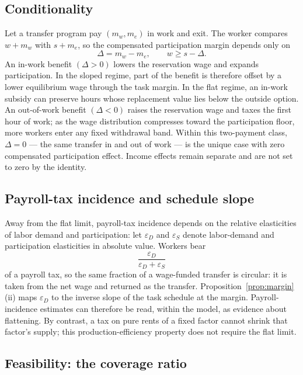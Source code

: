 \documentclass[12pt]{article}
\theoremstyle{plain}
\begin{document}
\subsection{Conditionality}\label{app:conditionality}

Let a transfer program pay $(m_w,m_e)$ in work and exit. The worker compares $w+m_w$ with $s+m_e$, so the compensated participation margin depends only on
\[
\Delta=m_w-m_e,
\qquad
w\ge s-\Delta.
\]
An in-work benefit $(\Delta>0)$ lowers the reservation wage and expands participation. In the sloped regime, part of the benefit is therefore offset by a lower equilibrium wage through the task margin. In the flat regime, an in-work subsidy can preserve hours whose replacement value lies below the outside option. An out-of-work benefit $(\Delta<0)$ raises the reservation wage and taxes the first hour of work; as the wage distribution compresses toward the participation floor, more workers enter any fixed withdrawal band. Within this two-payment class, $\Delta=0$ --- the same transfer in and out of work --- is the unique case with zero compensated participation effect. Income effects remain separate and are not set to zero by the identity.

\subsection{Payroll-tax incidence and schedule slope}\label{app:funding}

Away from the flat limit, payroll-tax incidence depends on the relative elasticities of labor demand and participation: let $\varepsilon_D$ and $\varepsilon_S$ denote labor-demand and participation elasticities in absolute value. Workers bear
\[
\frac{\varepsilon_D}{\varepsilon_D+\varepsilon_S}
\]
of a payroll tax, so the same fraction of a wage-funded transfer is circular: it is taken from the net wage and returned as the transfer. Proposition~\ref{prop:margin}(ii) maps $\varepsilon_D$ to the inverse slope of the task schedule at the margin. Payroll-incidence estimates can therefore be read, within the model, as evidence about flattening. By contrast, a tax on pure rents of a fixed factor cannot shrink that factor's supply; this production-efficiency property does not require the flat limit.

\subsection{Feasibility: the coverage ratio}\label{app:coverage}
\end{document}
